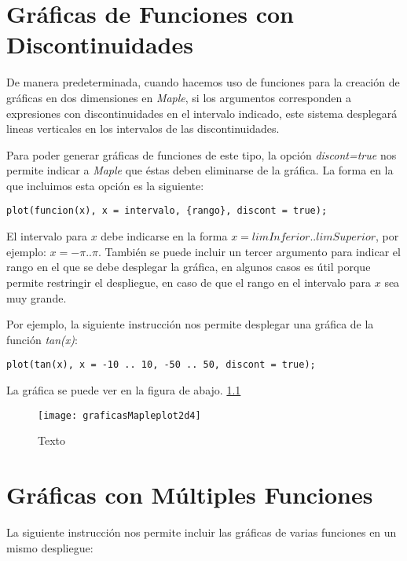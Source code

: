 \documentclass[letterpaper,12pt]{book}
\begin{document}
\chapter{Gráficas de Funciones con Discontinuidades}

\thispagestyle{empty}

De manera predeterminada, cuando hacemos uso de funciones para la creación de gráficas en 
dos dimensiones en \emph{Maple}, si los argumentos corresponden a expresiones con 
discontinuidades en el intervalo indicado, este sistema desplegará lineas verticales en
los intervalos de las discontinuidades.

Para poder generar gráficas de funciones de este tipo, la opción
\emph{discont=true} nos permite indicar a \emph{Maple} que éstas deben eliminarse de la
gráfica. La forma en la que incluimos esta opción es la siguiente:

\begin{verbatim}
plot(funcion(x), x = intervalo, {rango}, discont = true);
\end{verbatim}

El intervalo para $x$ debe indicarse en la forma $x=limInferior..limSuperior$, por ejemplo:
$x=-\pi..\pi$. También se puede incluir un tercer argumento para indicar el rango en el que
se debe desplegar la gráfica, en algunos casos es útil porque permite restringir el despliegue,
en caso de que el rango en el intervalo para $x$ sea muy grande.

Por ejemplo, la siguiente instrucción nos permite desplegar una gráfica de la función \emph{tan(x)}:

\begin{verbatim}
plot(tan(x), x = -10 .. 10, -50 .. 50, discont = true);
\end{verbatim}

La gráfica se puede ver en la figura de abajo. \ref{cap2f1}

\begin{figure}[h!]
\centering
\caption{Texto} \label{cap2f1}
\texttt{[image: graficasMapleplot2d4]}
\end{figure}

\chapter{Gráficas con Múltiples Funciones}

\thispagestyle{empty}

La siguiente instrucción nos permite incluir las gráficas de varias funciones en un mismo despliegue:
\end{document}

